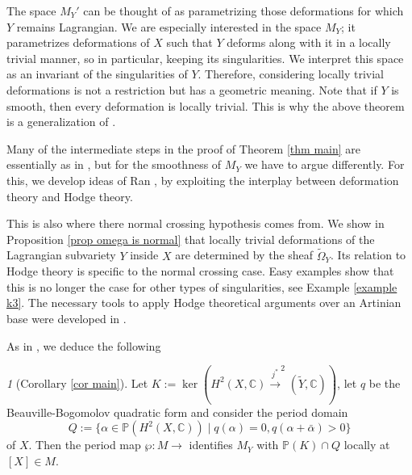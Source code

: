 \documentclass[a4paper,11pt,final]{amsart}
\theoremstyle{plain}
\theoremstyle{definition}
\numberwithin{equation}{section}
\theoremstyle{remark}
\newtheorem*{custom}{}}
\begin{document}
The space $M_Y'$ can be thought of as parametrizing those deformations for which $Y$ remains Lagrangian. We are especially interested in the space $M_Y$; it parametrizes deformations of $X$ such that $Y$ deforms along with it in a locally trivial manner, so in particular, keeping its singularities. We interpret this space as an invariant of the singularities of $Y$. Therefore, considering locally trivial deformations is not a restriction but has a geometric meaning. Note that if $Y$ is smooth, then every deformation is locally trivial. This is why the above theorem is a generalization of \cite[0.1 Th\'eor\`eme]{Vo92}.

Many of the intermediate steps in the proof of Theorem \ref{thm main} are essentially as in \cite{Vo92}, but for the smoothness of $M_Y$ we have to argue differently. For this, we develop ideas of Ran \cite{Ra92Lif}, \cite{Ra92Def} by exploiting the interplay between deformation theory and Hodge theory. 

This is also where there normal crossing hypothesis comes from. We show in Proposition \ref{prop omega is normal} that locally trivial deformations of the Lagrangian subvariety $Y$ inside $X$ are determined by the sheaf ${\widetilde{\Omega}}_Y$. Its relation to Hodge theory is specific to the normal crossing case. Easy examples show that this is no longer the case for other types of singularities, see Example \ref{example k3}.
The necessary tools to apply Hodge theoretical arguments over an Artinian base were developed in \cite{CL12}. 

As in \cite{Vo92}, we deduce the following

\begin{custom}[Corollary \ref{cor main}]
Let $K:=\ker\left(H^2(X,{{\mathbb C}}) {\xrightarrow{\ j^*\ }}^2({{\widetilde{Y}}},{{\mathbb C}})\right)$, let $q$ be the Beau\-ville-Bogomolov quadratic form and consider the period domain
\[
Q := \{\alpha \in {{\mathbb P}}(H^2(X,{{\mathbb C}}))\mid q(\alpha)=0, q(\alpha+\bar\alpha)>0\}
\]
of $X$. Then the period map $\wp:M{\xrightarrow{\ \ }}$ identifies $M_Y$ with ${{\mathbb P}}(K)\cap Q$ locally at $[X]\in M$.
\end{custom}
\end{document}
